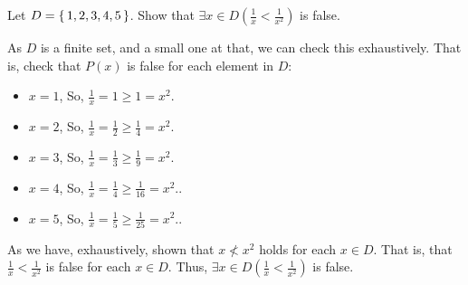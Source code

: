 \guard



\begin{exmp}
\label{exmp:existentialStatementOverFiniteSetFalse}
  Let $D=\left\{\, 1,2,3,4,5 \,\right\}$.
	Show that $\exists x\in D(\frac{1}{x} < \frac{1}{x^2})$ is false.

	As $D$ is a finite set, and a small one at that, we can check this exhaustively.
	That is, check that $P(x)$ is false for each element in $D$:
	\begin{itemize}
		\item $x=1$,
			So, $\frac{1}{x} = 1 \geq 1 = x^2$.
		\item $x=2$,
			So, $\frac{1}{x} = \frac{1}{2} \geq \frac{1}{4} = x^2$.
		\item $x=3$,
			So, $\frac{1}{x} = \frac{1}{3} \geq \frac{1}{9} = x^2$.
		\item $x=4$,
			So, $\frac{1}{x} = \frac{1}{4} \geq \frac{1}{16} = x^2$..
		\item $x=5$,
			So, $\frac{1}{x} = \frac{1}{5} \geq \frac{1}{25} = x^2$..
	\end{itemize}
	As we have, exhaustively, shown that $x \not< x^2$ holds for each $x\in D$.
	That is, that $\frac{1}{x} < \frac{1}{x^2}$ is false for each $x\in D$.
	Thus, $\exists x\in D(\frac{1}{x} < \frac{1}{x^2})$ is false.
\end{exmp}
